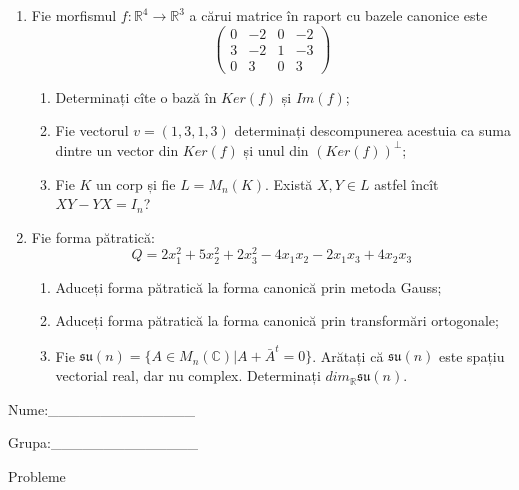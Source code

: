 \documentclass{article}
\begin{document}
\begin{enumerate}
 \item Fie morfismul $f:\mathbb{R}^4 \to \mathbb{R}^3$ a cărui matrice în raport cu bazele canonice este
$$\begin{pmatrix}
0&-2&0&-2\\
3&-2&1&-3\\
0&3&0&3
\end{pmatrix}$$

\begin{enumerate}
\item Determinați cîte o bază în $Ker(f)$ și $Im(f)$;
\item Fie vectorul $v=(1,3,1,3)$ determinați descompunerea acestuia ca suma dintre un vector din $Ker(f)$ și unul din $(Ker(f))^\perp$;
\item Fie $K$ un corp și fie $L=M_n(K)$. Există $X,Y \in L$ astfel încît $XY-YX=I_n$?  
\end{enumerate}
\item Fie forma pătratică:
$$Q= 2x_1^2+5x_2^2+2x_3^2-4x_1x_2-2x_1x_3+4x_2x_3$$

\begin{enumerate}
\item Aduceți forma pătratică la forma canonică prin metoda Gauss;
\item Aduceți forma pătratică la forma canonică prin transformări ortogonale;
\item Fie $\mathfrak{su}(n)=\{ A \in M_n(\mathbb{C}) | A+\bar{A}^t=0\}$. Arătați că $\mathfrak{su}(n)$ este spațiu vectorial real, dar nu complex.
Determinați $dim_{\mathbb{R}}\mathfrak{su}(n)$.
\end{enumerate}
\end{enumerate}
\newpage
\begin{flushright}
Nume:\_\_\_\_\_\_\_\_\_\_\_\_\_\_
 
 
Grupa:\_\_\_\_\_\_\_\_\_\_\_\_\_\_
\end{flushright}
\begin{center}
\vspace{2cm}
{\Large Probleme}
\vspace{2cm}
\end{center}
\end{document}
